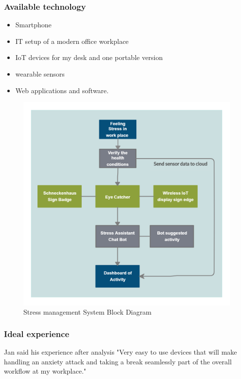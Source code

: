\subsubsection*{Available technology}
\begin{itemize}
    \item Smartphone
    \item IT setup of a modern office workplace
    \item IoT devices for my desk and one portable version
    \item wearable sensors
    \item Web applications and software.
\end{itemize}
\begin{figure}[ht] 
  \centering
  \includegraphics[width=1\textwidth]{chap4/block1.png} %
  \caption[Stress management System Block Diagram]{Stress management System Block Diagram }
  \label{fig:system_block}
\end{figure}
\subsubsection*{Ideal experience}
Jan said his experience after analysis "Very easy to use devices that will make handling an anxiety attack and taking a break seamlessly part of the overall workflow at my workplace."

